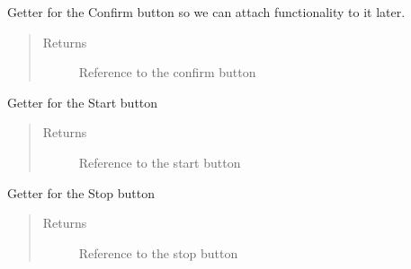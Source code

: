 \documentclass[letterpaper,10pt,english]{sphinxmanual}
\begin{document}
\begin{fulllineitems}
\begin{fulllineitems}
\begin{quote}
\begin{description}
\end{description}\end{quote}

\end{fulllineitems}


\begin{fulllineitems}
\label{\detokenize{index:src.Views.View_TrackingScreen.TrackingWindow.del_BtnConfirm}}
Getter for the Confirm button so we can attach functionality to it later.
\begin{quote}\begin{description}
\item[{Returns}] \leavevmode
Reference to the confirm button

\end{description}\end{quote}

\end{fulllineitems}


\begin{fulllineitems}
\label{\detokenize{index:src.Views.View_TrackingScreen.TrackingWindow.del_BtnStart}}
Getter for the Start button
\begin{quote}\begin{description}
\item[{Returns}] \leavevmode
Reference to the start button

\end{description}\end{quote}

\end{fulllineitems}


\begin{fulllineitems}
\label{\detokenize{index:src.Views.View_TrackingScreen.TrackingWindow.del_BtnStop}}
Getter for the Stop button
\begin{quote}\begin{description}
\item[{Returns}] \leavevmode
Reference to the stop button


\end{description}
\end{quote}
\end{fulllineitems}
\end{fulllineitems}
\end{document}
